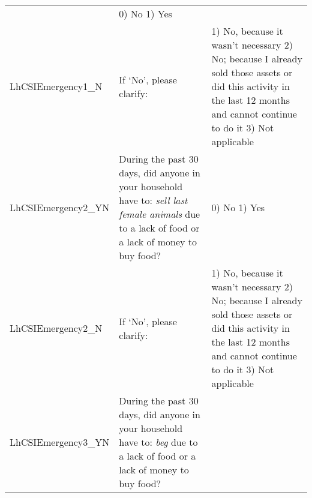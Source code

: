 \documentclass[
]{article}
\begin{document}
\begin{longtable}[]{@{}lll@{}}
\begin{minipage}[t]{0.49\columnwidth}
\end{minipage} & \begin{minipage}[t]{0.27\columnwidth}\raggedright
0) No 1) Yes\strut
\end{minipage}\tabularnewline
\begin{minipage}[t]{0.15\columnwidth}\raggedright
LhCSIEmergency1\_N\strut
\end{minipage} & \begin{minipage}[t]{0.49\columnwidth}\raggedright
If `No', please clarify:\strut
\end{minipage} & \begin{minipage}[t]{0.27\columnwidth}\raggedright
1) No, because it wasn't necessary 2) No; because I already sold those assets or did this activity in the last 12 months and cannot continue to do it 3) Not applicable\strut
\end{minipage}\tabularnewline
\begin{minipage}[t]{0.15\columnwidth}\raggedright
LhCSIEmergency2\_YN\strut
\end{minipage} & \begin{minipage}[t]{0.49\columnwidth}\raggedright
During the past 30 days, did anyone in your household have to: \emph{sell last female animals} due to a lack of food or a lack of money to buy food?\strut
\end{minipage} & \begin{minipage}[t]{0.27\columnwidth}\raggedright
0) No 1) Yes\strut
\end{minipage}\tabularnewline
\begin{minipage}[t]{0.15\columnwidth}\raggedright
LhCSIEmergency2\_N\strut
\end{minipage} & \begin{minipage}[t]{0.49\columnwidth}\raggedright
If `No', please clarify:\strut
\end{minipage} & \begin{minipage}[t]{0.27\columnwidth}\raggedright
1) No, because it wasn't necessary 2) No; because I already sold those assets or did this activity in the last 12 months and cannot continue to do it 3) Not applicable\strut
\end{minipage}\tabularnewline
\begin{minipage}[t]{0.15\columnwidth}\raggedright
LhCSIEmergency3\_YN\strut
\end{minipage} & \begin{minipage}[t]{0.49\columnwidth}\raggedright
During the past 30 days, did anyone in your household have to: \emph{beg } due to a lack of food or a lack of money to buy food?\strut

\end{minipage}
\end{longtable}
\end{document}
